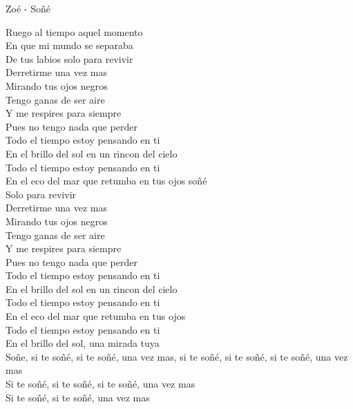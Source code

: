 \documentclass{article}
\begin{document}
Zoé - Soñé


Ruego al tiempo aquel momento
\\En que mi mundo se separaba
\\De tus labios solo para revivir
\\Derretirme una vez mas
\\Mirando tus ojos negros
\\Tengo ganas de ser aire
\\Y me respires para siempre
\\Pues no tengo nada que perder
\\Todo el tiempo estoy pensando en ti
\\En el brillo del sol en un rincon del cielo
\\Todo el tiempo estoy pensando en ti
\\En el eco del mar que retumba en tus ojos soñé
\\Solo para revivir
\\Derretirme una vez mas
\\Mirando tus ojos negros
\\Tengo ganas de ser aire
\\Y me respires para siempre
\\Pues no tengo nada que perder
\\Todo el tiempo estoy pensando en ti
\\En el brillo del sol en un rincon del cielo
\\Todo el tiempo estoy pensando en ti
\\En el eco del mar que retumba en tus ojos
\\Todo el tiempo estoy pensando en ti
\\En el brillo del sol, una mirada tuya
\\Soñe, si te soñé, si te soñé, una vez mas, si te soñé, si te soñé, si te soñé, una vez mas
\\Si te soñé, si te soñé, si te soñé, una vez mas
\\Si te soñé, si te soñé, una vez mas
\end{document}
